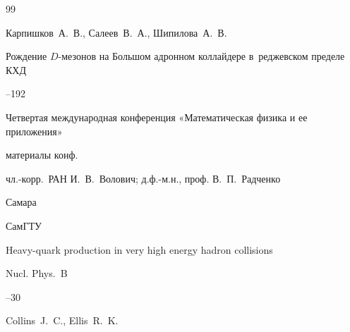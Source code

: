 \begin{thebibliography}{99}




\by  Карпишков~А.~В., Салеев~В.~А., Шипилова~А.~В. 

\paper Рождение $D$-мезонов на Большом адронном коллайдере в~реджевском пределе КХД

--192

\inbook Четвертая международная конференция «Математическая физика и ее приложения»

\bookinfo материалы конф. 

\eds чл.-корр.~РАН И.~В.~Волович; д.ф.-м.н., проф. В.~П.~Радченко

\publaddr Самара

\publ СамГТУ


















\paper Heavy-quark production in very high energy hadron collisions


\jour Nucl. Phys.~B 



--30

\by Collins~J.~C., Ellis~R.~K.






\end{thebibliography}
